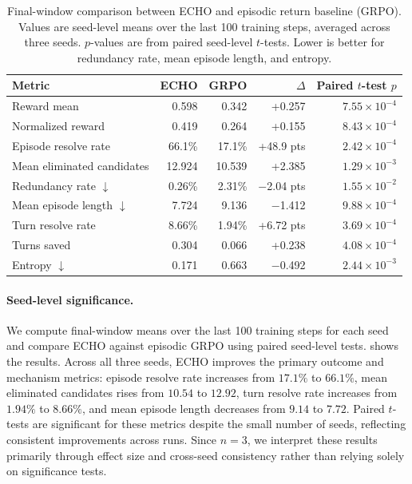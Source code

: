 \documentclass[11pt]{article}
\theoremstyle{plain}
\theoremstyle{definition}
\theoremstyle{remark}
\begin{document}
\begin{table}[t]
\centering
\scriptsize
\setlength{\tabcolsep}{6pt}
\renewcommand{\arraystretch}{1.12}
\begin{tabular}{lrrrr}
\toprule
\textbf{Metric} & \textbf{\textsc{ECHO}} & \textbf{GRPO} & \textbf{$\Delta$} & \textbf{Paired $t$-test $p$} \\
\midrule
Reward mean & 0.598 & 0.342 & +0.257 & $7.55{\times}10^{-4}$ \\
Normalized reward & 0.419 & 0.264 & +0.155 & $8.43{\times}10^{-4}$ \\
Episode resolve rate & 66.1\% & 17.1\% & +48.9 pts & $2.42{\times}10^{-4}$ \\
Mean eliminated candidates & 12.924 & 10.539 & +2.385 & $1.29{\times}10^{-3}$ \\
Redundancy rate $\downarrow$ & 0.26\% & 2.31\% & $-$2.04 pts & $1.55{\times}10^{-2}$ \\
Mean episode length $\downarrow$ & 7.724 & 9.136 & $-$1.412 & $9.88{\times}10^{-4}$ \\
Turn resolve rate & 8.66\% & 1.94\% & +6.72 pts & $3.69{\times}10^{-4}$ \\
Turns saved & 0.304 & 0.066 & +0.238 & $4.08{\times}10^{-4}$ \\
Entropy $\downarrow$ & 0.171 & 0.663 & $-$0.492 & $2.44{\times}10^{-3}$ \\
\bottomrule
\end{tabular}
\caption{
Final-window comparison between \textsc{ECHO} and episodic return baseline (GRPO). Values are seed-level means over the last 100 training steps, averaged across three seeds. \(p\)-values are from paired seed-level \(t\)-tests. Lower is better for redundancy rate, mean episode length, and entropy.
}
\label{tab:echo_grpo_final_window_stats}
\end{table}

\paragraph{Seed-level significance.}
We compute final-window means over the last 100 training steps for each seed and compare \textsc{ECHO} against episodic GRPO using paired seed-level tests.  shows the results. Across all three seeds, \textsc{ECHO} improves the primary outcome and mechanism metrics: episode resolve rate increases from \(17.1\%\) to \(66.1\%\), mean eliminated candidates rises from \(10.54\) to \(12.92\), turn resolve rate increases from \(1.94\%\) to \(8.66\%\), and mean episode length decreases from \(9.14\) to \(7.72\). Paired \(t\)-tests are significant for these metrics despite the small number of seeds, reflecting consistent improvements across runs. Since \(n=3\), we interpret these results primarily through effect size and cross-seed consistency rather than relying solely on significance tests.
\end{document}
